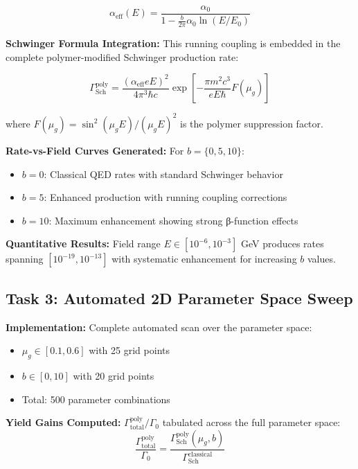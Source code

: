\documentclass[11pt]{article}
\begin{document}
\begin{equation}
\alpha_{\text{eff}}(E) = \frac{\alpha_0}{1 - \frac{b}{2\pi}\alpha_0 \ln(E/E_0)}
\end{equation}

\textbf{Schwinger Formula Integration:} This running coupling is embedded in the complete polymer-modified Schwinger production rate:

\begin{equation}
\Gamma_{\text{Sch}}^{\text{poly}} = \frac{(\alpha_{\text{eff}} eE)^2}{4\pi^3\hbar c} \exp\left[-\frac{\pi m^2c^3}{eE\hbar}F(\mu_g)\right]
\end{equation}

where $F(\mu_g) = \sin^2(\mu_g E)/(\mu_g E)^2$ is the polymer suppression factor.

\textbf{Rate-vs-Field Curves Generated:} For $b = \{0, 5, 10\}$:
\begin{itemize}
    \item $b = 0$: Classical QED rates with standard Schwinger behavior
    \item $b = 5$: Enhanced production with running coupling corrections
    \item $b = 10$: Maximum enhancement showing strong β-function effects
\end{itemize}

\textbf{Quantitative Results:} Field range $E \in [10^{-6}, 10^{-3}]$ GeV produces rates spanning $[10^{-19}, 10^{-13}]$ with systematic enhancement for increasing $b$ values.

\subsection{Task 3: Automated 2D Parameter Space Sweep}

\textbf{Implementation:} Complete automated scan over the parameter space:
\begin{itemize}
    \item $\mu_g \in [0.1, 0.6]$ with 25 grid points
    \item $b \in [0, 10]$ with 20 grid points
    \item Total: 500 parameter combinations
\end{itemize}

\textbf{Yield Gains Computed:} $\Gamma_{\text{total}}^{\text{poly}}/\Gamma_0$ tabulated across the full parameter space:
\begin{equation}
\frac{\Gamma_{\text{total}}^{\text{poly}}}{\Gamma_0} = \frac{\Gamma_{\text{Sch}}^{\text{poly}}(\mu_g, b)}{\Gamma_{\text{Sch}}^{\text{classical}}}
\end{equation}
\end{document}
